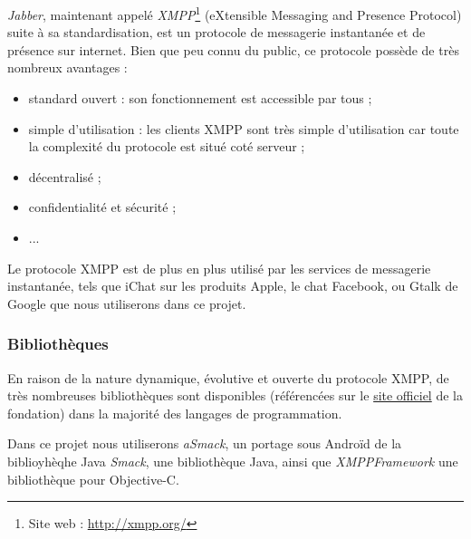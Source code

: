 \textit{Jabber}, maintenant appelé \textit{XMPP}\footnote{Site web : \href{http://xmpp.org/}{http://xmpp.org/}} (eXtensible Messaging and Presence Protocol) suite à sa standardisation, est un protocole de messagerie instantanée et de présence sur internet.
Bien que peu connu du public, ce protocole possède de très nombreux avantages :
\begin{itemize}
	\item standard ouvert : son fonctionnement est accessible par tous ;
	\item simple d'utilisation : les clients XMPP sont très simple d'utilisation car toute la complexité du protocole est situé coté serveur ;
	\item décentralisé ;
	\item confidentialité et sécurité ;
	\item ...
\\
\end{itemize}


Le protocole XMPP est de plus en plus utilisé par les services de messagerie instantanée, tels que iChat sur les produits Apple, le chat Facebook, ou Gtalk de Google que nous utiliserons dans ce projet.
\\


\subsubsection{Bibliothèques}

En raison de la nature dynamique, évolutive et ouverte du protocole XMPP, de très nombreuses bibliothèques sont disponibles (référencées sur le \href{http://xmpp.org/xmpp-software/libraries/}{site officiel} de la fondation) dans la majorité des langages de programmation.

Dans ce projet nous utiliserons \textit{aSmack}, un portage sous Androïd de la biblioyhèqhe Java \textit{Smack}, une bibliothèque Java, ainsi que \textit{XMPPFramework} une bibliothèque pour Objective-C.
\\




